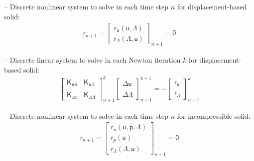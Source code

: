 \documentclass[a4paper,12pt]{report}
\newcommand{\bs}[1]{\boldsymbol{#1}}
\newcommand{\ROP}{\bs{\mathsf{r}}}
\newcommand{\LMZ}{\bs{\mathsf{\Lambda}}}
\newcommand{\lmzi}{\mathit{\Lambda}} %
\begin{document}
-- Discrete nonlinear system to solve in each time step $n$ for displacement-based solid:
\begin{equation}
\label{equation-nonlin-sys-solid-0d}
\begin{aligned}
\ROP_{n+1} = \begin{bmatrix} \ROP_{u}(\boldsymbol{\mathsf{u}},\LMZ) \\ \ROP_{\mathit{\Lambda}}(\LMZ,\boldsymbol{\mathsf{u}}) \end{bmatrix}_{n+1} = \boldsymbol{\mathsf{0}}
\end{aligned}
\end{equation}

-- Discrete linear system to solve in each Newton iteration $k$ for displacement-based solid:
\begin{equation}
\label{equation-lin-sys-solid-0d}
\begin{aligned}
\begin{bmatrix} \boldsymbol{\mathsf{K}}_{uu} & \boldsymbol{\mathsf{K}}_{u\lmzi} \\ \\ \boldsymbol{\mathsf{K}}_{\lmzi u} & \boldsymbol{\mathsf{K}}_{\lmzi\lmzi}\end{bmatrix}_{n+1}^{k}\begin{bmatrix} \Delta\boldsymbol{\mathsf{u}} \\ \\ \Delta\LMZ \end{bmatrix}_{n+1}^{k+1}=-\begin{bmatrix} \ROP_{u} \\ \\ \ROP_{\lmzi}\end{bmatrix}_{n+1}^{k}
\end{aligned}
\end{equation}

-- Discrete nonlinear system to solve in each time step $n$ for incompressible solid:
\begin{equation}
\label{equation-nonlin-sys-solid-inc-0d}
\begin{aligned}
\ROP_{n+1} = \begin{bmatrix} \ROP_{u}(\boldsymbol{\mathsf{u}},\boldsymbol{\mathsf{p}},\LMZ) \\ \ROP_{p}(\boldsymbol{\mathsf{u}}) \\ \ROP_{\mathit{\Lambda}}(\LMZ,\boldsymbol{\mathsf{u}}) \end{bmatrix}_{n+1} = \boldsymbol{\mathsf{0}}
\end{aligned}
\end{equation}
\end{document}
